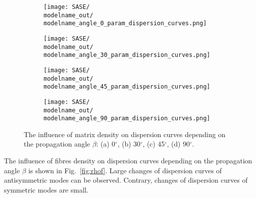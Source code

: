 \documentclass[preprint,12pt]{elsarticle}
\begin{document}
 \begin{figure} [h!]
 	\newcommand{\modelname}{SASE2}
 	\centering
 	\begin{subfigure}[b]{0.49\textwidth}
 		\centering
 		\texttt{[image: SASE/\\modelname\_out/\\modelname\_angle\_0\_param\_dispersion\_curves.png]}
 		\caption{}
 		\label{fig:rhom0}
 	\end{subfigure}
 	\hfill
 	\begin{subfigure}[b]{0.49\textwidth}
 		\centering
 		\texttt{[image: SASE/\\modelname\_out/\\modelname\_angle\_30\_param\_dispersion\_curves.png]}
 		\caption{}
 		\label{fig:rhom30}
 	\end{subfigure}
 	\begin{subfigure}[b]{0.49\textwidth}
 		\centering
 		\texttt{[image: SASE/\\modelname\_out/\\modelname\_angle\_45\_param\_dispersion\_curves.png]}
 		\caption{}
 		\label{fig:rhom45}
 	\end{subfigure}
 	\hfill
 	\begin{subfigure}[b]{0.49\textwidth}
 		\centering
 		\texttt{[image: SASE/\\modelname\_out/\\modelname\_angle\_90\_param\_dispersion\_curves.png]}
 		\caption{}
 		\label{fig:rhom90}
 	\end{subfigure}
 	\caption{The influence of matrix density on dispersion curves depending on the propagation angle $\beta$: (a) 0$^{\circ}$, (b) 30$^{\circ}$, (c) 45$^{\circ}$, (d) 90$^{\circ}$.} 
 	\label{fig:rhom}
 \end{figure}
\clearpage

The influence of fibres density on dispersion curves depending on the propagation angle $\beta$ is shown in Fig.~\ref{fig:rhof}. Large changes of dispersion curves of antisymmetric modes can be observed. Contrary, changes of dispersion curves of symmetric modes are small.
\end{document}
